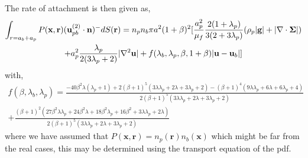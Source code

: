 \documentclass[12pt]{My_preprint}
\begin{document}
The rate of attachment is then given as, 
\begin{multline*} 
    \int_{r=a_b+a_p } 
    P(\textbf{x},\textbf{r}) (\textbf{u}_{pb}^{(2)}\cdot \textbf{n})^- dS(\textbf{r})
    =
    n_pn_b \pi a^2(1+\beta)^2 [
        \frac{a_p^2}{\mu_f}
        \frac{2(1+\lambda_p)}{3(2+3\lambda_p)}( \rho_p|\textbf{g}|+ |\mathbf{\nabla}\cdot\bm\Sigma|)\\
        + a_p^2 \frac{\lambda_p}{2(3\lambda_p +2)} |\mathbf{\nabla}^2 \textbf{u}|
        + f(\lambda_b,\lambda_p,\beta,1+\beta)  |\textbf{u} - \textbf{u}_b|
    ]
\end{multline*}
with, 
\begin{multline}
    f(\beta, \lambda_b, \lambda_p)
    =
    \frac{- 40 \beta^{2} \lambda \left(\lambda_{p} + 1\right) + 2 \left(\beta + 1\right)^{5} \left(3 \lambda \lambda_{p} + 2 \lambda + 3 \lambda_{p} + 2\right) - \left(\beta + 1\right)^{4} \left(9 \lambda \lambda_{p} + 6 \lambda + 6 \lambda_{p} + 4\right) }{2 \left(\beta + 1\right)^{5} \left(3 \lambda \lambda_{p} + 2 \lambda + 3 \lambda_{p} + 2\right)}\\
    + \frac{ \left(\beta + 1\right)^{2} \left(27 \beta^{2} \lambda \lambda_{p} + 24 \beta^{2} \lambda + 18 \beta^{2} \lambda_{p} + 16 \beta^{2} + 3 \lambda \lambda_{p} + 2 \lambda\right)}{2 \left(\beta + 1\right)^{5} \left(3 \lambda \lambda_{p} + 2 \lambda + 3 \lambda_{p} + 2\right)}
\end{multline}
where we have assumed that $P(\textbf{x},\textbf{r}) = n_p(\textbf{r})n_b(\textbf{x})$ which might be far from the real cases, this may be determined using the transport equation of the pdf. 


\appendix
\end{document}
